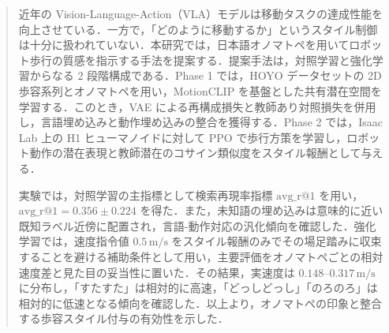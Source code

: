 \begin{abstract}
\label{chap:概要}\par

近年の Vision-Language-Action（VLA）モデルは移動タスクの達成性能を向上させている．一方で，「どのように移動するか」というスタイル制御は十分に扱われていない．本研究では，日本語オノマトペを用いてロボット歩行の質感を指示する手法を提案する．提案手法は，対照学習と強化学習からなる 2 段階構成である．Phase 1 では，HOYO データセットの 2D 歩容系列とオノマトペを用い，MotionCLIP を基盤とした共有潜在空間を学習する．このとき，VAE による再構成損失と教師あり対照損失を併用し，言語埋め込みと動作埋め込みの整合を獲得する．Phase 2 では，Isaac Lab 上の H1 ヒューマノイドに対して PPO で歩行方策を学習し，ロボット動作の潜在表現と教師潜在のコサイン類似度をスタイル報酬として与える．

実験では，対照学習の主指標として検索再現率指標 $\mathrm{avg\_r@1}$ を用い，$\mathrm{avg\_r@1}=0.356\pm0.224$ を得た．また，未知語の埋め込みは意味的に近い既知ラベル近傍に配置され，言語-動作対応の汎化傾向を確認した．強化学習では，速度指令値 $0.5\,\mathrm{m/s}$ をスタイル報酬のみでその場足踏みに収束することを避ける補助条件として用い，主要評価をオノマトペごとの相対速度差と見た目の妥当性に置いた．その結果，実速度は $0.148$--$0.317\,\mathrm{m/s}$ に分布し，「すたすた」は相対的に高速，「どっしどっし」「のろのろ」は相対的に低速となる傾向を確認した．以上より，オノマトペの印象と整合する歩容スタイル付与の有効性を示した．

\end{abstract}
